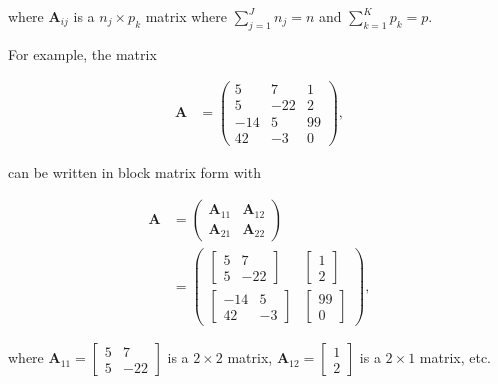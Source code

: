 \documentclass[
]{book}
\theoremstyle{definition}
\theoremstyle{definition}
\theoremstyle{definition}
\theoremstyle{definition}
\theoremstyle{remark}
\begin{document}
where \(\mathbf{A}_{ij}\) is a \(n_j \times p_k\) matrix where \(\sum_{j=1}^J n_j = n\) and \(\sum_{k=1}^K p_k = p\).

For example, the matrix

\[
\begin{aligned}
\mathbf{A} & = \begin{pmatrix} 5 & 7 & 1 \\
5 & -22  & 2 \\
-14 & 5 & 99 \\
42 & -3 & 0\end{pmatrix},
\end{aligned}
\]

can be written in block matrix form with

\[
\begin{aligned}
\mathbf{A} & =
\begin{pmatrix} \mathbf{A}_{11} & \mathbf{A}_{12} \\
\mathbf{A}_{21} & \mathbf{A}_{22} \end{pmatrix} \\
& = \begin{pmatrix} \begin{bmatrix} 5 & 7 \\
5 & -22 \end{bmatrix} &
\begin{bmatrix} 1 \\
2 \end{bmatrix} \\
\begin{bmatrix}
-14 & 5 \\
42 & -3
\end{bmatrix} &
\begin{bmatrix} 99 \\ 0 \end{bmatrix}
\end{pmatrix},
\end{aligned}
\]

where \(\mathbf{A}_{11} = \begin{bmatrix} 5 & 7 \\ 5 & -22 \end{bmatrix}\) is a \(2 \times 2\) matrix, \(\mathbf{A}_{12} = \begin{bmatrix} 1 \\ 2 \end{bmatrix}\) is a \(2 \times 1\) matrix, etc.
\end{document}
